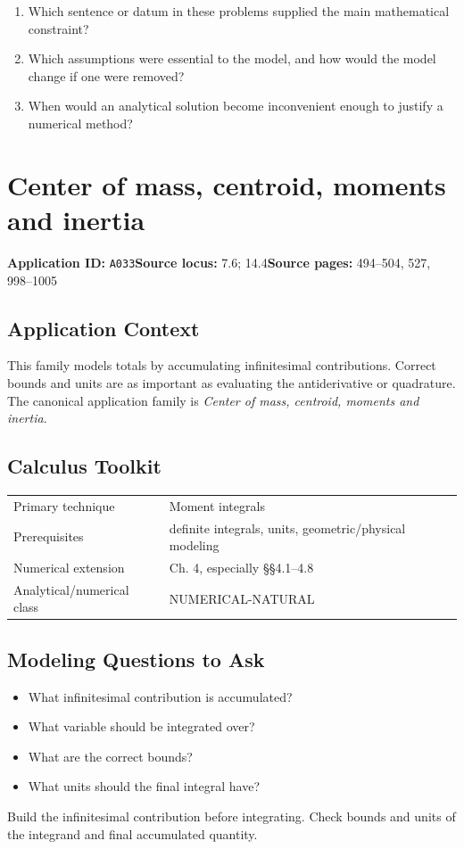 \documentclass[11pt]{book}
\newcommand{\pid}[1]{\texttt{#1}}
\begin{document}
\begin{reflectionbox}\begin{enumerate}
\item Which sentence or datum in these problems supplied the main mathematical constraint?
\item Which assumptions were essential to the model, and how would the model change if one were removed?
\item When would an analytical solution become inconvenient enough to justify a numerical method?
\end{enumerate}\end{reflectionbox}
\chapter{Center of mass, centroid, moments and inertia}\label{app:A033}
\textbf{Application ID:} \pid{A033}\quad \textbf{Source locus:} 7.6; 14.4\quad \textbf{Source pages:} 494–504, 527, 998–1005
\section*{Application Context}
This family models totals by accumulating infinitesimal contributions. Correct bounds and units are as important as evaluating the antiderivative or quadrature. The canonical application family is \emph{Center of mass, centroid, moments and inertia}.
\section*{Calculus Toolkit}
\begin{tabularx}{\textwidth}{@{}lX@{}}\toprule
Primary technique & Moment integrals \\
Prerequisites & definite integrals, units, geometric/physical modeling \\
Numerical extension & Ch. 4, especially §§4.1–4.8 \\
Analytical/numerical class & NUMERICAL-NATURAL \\
\bottomrule\end{tabularx}
\section*{Modeling Questions to Ask}\begin{itemize}
\item What infinitesimal contribution is accumulated?
\item What variable should be integrated over?
\item What are the correct bounds?
\item What units should the final integral have?
\end{itemize}
\begin{errorbox}Build the infinitesimal contribution before integrating. Check bounds and units of the integrand and final accumulated quantity.\end{errorbox}
\end{document}
